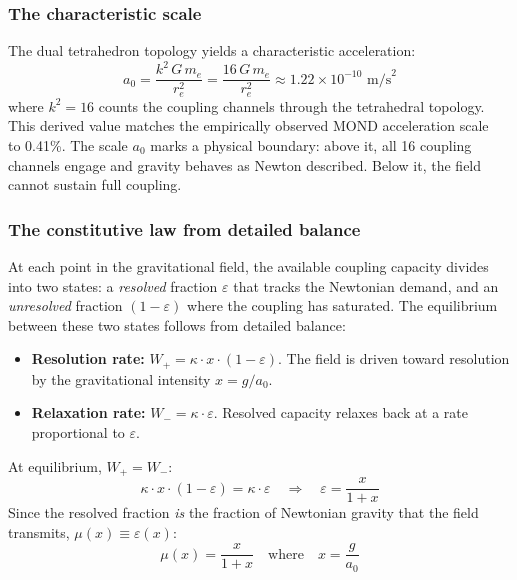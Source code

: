 \documentclass[aps,prd,preprint,superscriptaddress,showpacs,preprintnumbers,amsmath,amssymb,nofootinbib]{revtex4-2}
\begin{document}
\subsubsection*{The characteristic scale}

The dual tetrahedron topology yields a characteristic acceleration:
\begin{equation}
a_0 = \frac{k^2 \, G \, m_e}{r_e^2} = \frac{16 \, G \, m_e}{r_e^2} \approx 1.22 \times 10^{-10} \text{ m/s}^2
\label{eq:a0-dm}
\end{equation}
where $k^2 = 16$ counts the coupling channels through the tetrahedral topology. This derived value matches the empirically observed MOND acceleration scale~\cite{milgrom1983} to 0.41\%. The scale $a_0$ marks a physical boundary: above it, all 16 coupling channels engage and gravity behaves as Newton described. Below it, the field cannot sustain full coupling.

\subsubsection*{The constitutive law from detailed balance}

At each point in the gravitational field, the available coupling capacity divides into two states: a \emph{resolved} fraction $\varepsilon$ that tracks the Newtonian demand, and an \emph{unresolved} fraction $(1 - \varepsilon)$ where the coupling has saturated. The equilibrium between these two states follows from detailed balance:
\begin{itemize}
\item \textbf{Resolution rate:} $W_+ = \kappa \cdot x \cdot (1 - \varepsilon)$. The field is driven toward resolution by the gravitational intensity $x = g/a_0$.
\item \textbf{Relaxation rate:} $W_- = \kappa \cdot \varepsilon$. Resolved capacity relaxes back at a rate proportional to $\varepsilon$.
\end{itemize}
At equilibrium, $W_+ = W_-$:
\begin{equation}
\kappa \cdot x \cdot (1 - \varepsilon) = \kappa \cdot \varepsilon \quad \Longrightarrow \quad \varepsilon = \frac{x}{1 + x}
\end{equation}
Since the resolved fraction \emph{is} the fraction of Newtonian gravity that the field transmits, $\mu(x) \equiv \varepsilon(x)$:
\begin{equation}
\mu(x) = \frac{x}{1+x} \quad \text{where} \quad x = \frac{g}{a_0}
\label{eq:mu-dm}
\end{equation}
\end{document}
